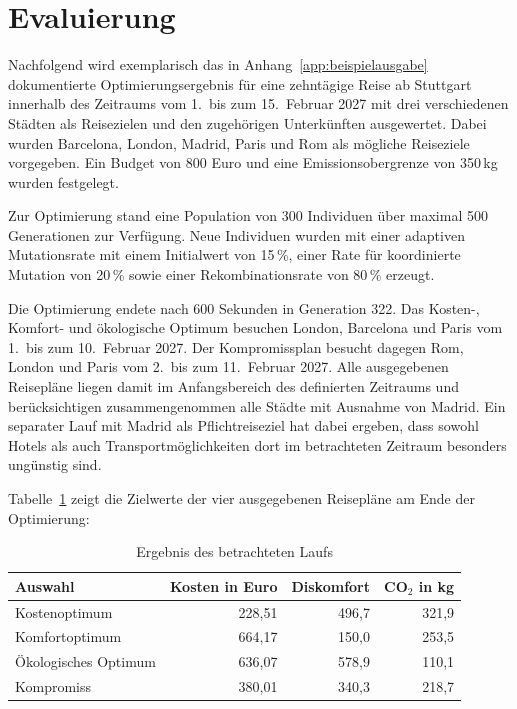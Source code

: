 \section{Evaluierung}
\label{sec:evaluierung}

Nachfolgend wird exemplarisch das in Anhang~\ref{app:beispielausgabe} dokumentierte Optimierungsergebnis für eine zehntägige Reise ab Stuttgart innerhalb des Zeitraums vom 1.\ bis zum 15.\ Februar 2027 mit drei verschiedenen Städten als Reisezielen und den zugehörigen Unterkünften ausgewertet. Dabei wurden Barcelona, London, Madrid, Paris und Rom als mögliche Reiseziele vorgegeben. Ein Budget von 800 Euro und eine Emissionsobergrenze von 350\,kg wurden festgelegt.

Zur Optimierung stand eine Population von 300 Individuen über maximal 500 Generationen zur Verfügung. Neue Individuen wurden mit einer adaptiven Mutationsrate mit einem Initialwert von 15\,\%, einer Rate für koordinierte Mutation von 20\,\% sowie einer Rekombinationsrate von 80\,\% erzeugt.

Die Optimierung endete nach 600 Sekunden in Generation 322. Das Kosten-, Komfort- und ökologische Optimum besuchen London, Barcelona und Paris vom 1.\ bis zum 10.\ Februar 2027. Der Kompromissplan besucht dagegen Rom, London und Paris vom 2.\ bis zum 11.\ Februar 2027. Alle ausgegebenen Reisepläne liegen damit im Anfangsbereich des definierten Zeitraums und berücksichtigen zusammengenommen alle Städte mit Ausnahme von Madrid. Ein separater Lauf mit Madrid als Pflichtreiseziel hat dabei ergeben, dass sowohl Hotels als auch Transportmöglichkeiten dort im betrachteten Zeitraum besonders ungünstig sind.

Tabelle~\ref{tab:eval_empfehlungen} zeigt die Zielwerte der vier ausgegebenen Reisepläne am Ende der Optimierung:

\begin{table}[H]
  \centering
  \small
  \begin{tabular}{@{}lrrr@{}}
    \toprule
    Auswahl & Kosten in Euro & Diskomfort & CO$_2$ in kg \\
    \midrule
    Kostenoptimum     & 228,51 & 496,7 & 321,9 \\
    Komfortoptimum    & 664,17 & 150,0 & 253,5 \\
    Ökologisches Optimum & 636,07 & 578,9 & 110,1 \\
    Kompromiss        & 380,01 & 340,3 & 218,7 \\
    \bottomrule
  \end{tabular}
  \caption{Ergebnis des betrachteten Laufs}
  \label{tab:eval_empfehlungen}
\end{table}

